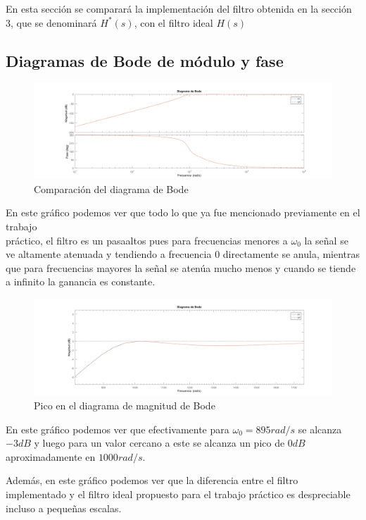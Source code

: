 En esta sección se comparará la implementación del filtro obtenida en la sección 3, que se denominará $H^{*}(s)$, con el filtro ideal $H(s)$

\subsection{Diagramas de Bode de módulo y fase}

\begin{figure}[!h]
    \centering
    \includegraphics[width=1\textwidth]{resources/Comparacion_Bode.png}
    \caption{Comparación del diagrama de Bode}
\end{figure}

En este gráfico podemos ver que todo lo que ya fue mencionado previamente en el trabajo\\ práctico, el filtro es un pasaaltos pues para frecuencias menores a $\omega_0$ la señal se ve altamente atenuada y tendiendo a frecuencia 0 directamente se anula, mientras que para frecuencias mayores la señal se atenúa mucho menos y cuando se tiende a infinito la ganancia es constante.

\begin{figure}[!h]
    \centering
    \includegraphics[width=1\textwidth]{resources/Bode_zoom.png}
    \caption{Pico en el diagrama de magnitud de Bode}
\end{figure}

En este gráfico podemos ver que efectivamente para $\omega_0 = 895 rad/s$ se alcanza $-3dB$ y luego para un valor cercano a este se alcanza un pico de $0dB$ aproximadamente en $1000 rad/s$.

Además, en este gráfico podemos ver que la diferencia entre el filtro implementado y el filtro ideal propuesto para el trabajo práctico es despreciable incluso a pequeñas escalas.

